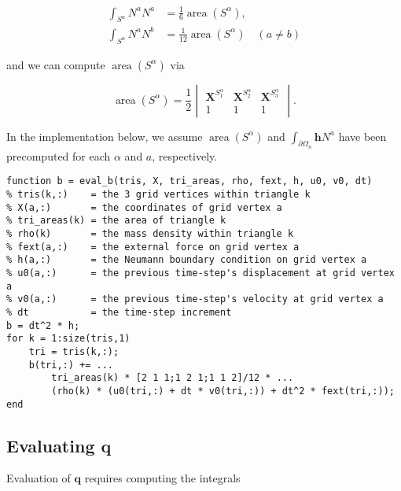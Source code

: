 \documentclass{article}
\begin{document}
\begin{subequations} \label{intNaNb}
\begin{align}
\int_{S^{\alpha}} N^a N^a & = \frac{1}{6} \operatorname{area} \left( S^{\alpha} \right), \\
\int_{S^{\alpha}} N^a N^b & = \frac{1}{12} \operatorname{area} \left( S^{\alpha} \right) \quad \left( a \neq b \right)
\end{align}
\end{subequations}

and we can compute \(\operatorname{area} \left( S^{\alpha} \right)\) via

\begin{equation}
\operatorname{area} \left( S^{\alpha} \right) = \frac{1}{2} \begin{vmatrix} \mathbf{X}^{S^{\alpha}_1} & \mathbf{X}^{S^{\alpha}_2} & \mathbf{X}^{S^{\alpha}_3} \\ 1 & 1 & 1 \end{vmatrix}.
\end{equation}

In the implementation below, we assume \(\operatorname{area} \left( S^{\alpha} \right)\) and \(\int_{\partial \Omega_n} \mathbf{h} N^a\) have been precomputed for each \(\alpha\) and \(a\), respectively.

\begin{verbatim}
function b = eval_b(tris, X, tri_areas, rho, fext, h, u0, v0, dt)
% tris(k,:)    = the 3 grid vertices within triangle k
% X(a,:)       = the coordinates of grid vertex a
% tri_areas(k) = the area of triangle k
% rho(k)       = the mass density within triangle k
% fext(a,:)    = the external force on grid vertex a
% h(a,:)       = the Neumann boundary condition on grid vertex a
% u0(a,:)      = the previous time-step's displacement at grid vertex a
% v0(a,:)      = the previous time-step's velocity at grid vertex a
% dt           = the time-step increment
b = dt^2 * h;
for k = 1:size(tris,1)
    tri = tris(k,:);
    b(tri,:) += ...
        tri_areas(k) * [2 1 1;1 2 1;1 1 2]/12 * ...
        (rho(k) * (u0(tri,:) + dt * v0(tri,:)) + dt^2 * fext(tri,:));
end
\end{verbatim}

\subsection{Evaluating \(\mathbf{q}\)}

Evaluation of \(\mathbf{q}\) requires computing the integrals
\end{document}
